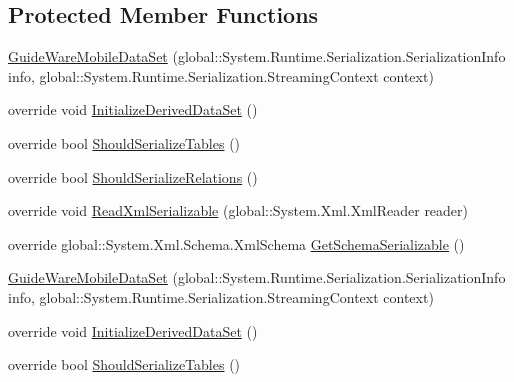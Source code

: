 \subsection*{Protected Member Functions}
\begin{DoxyCompactItemize}
\item 
\hyperlink{class_env_int_1_1_win32_1_1_field_tech_1_1_manager_1_1_data_sets_1_1_guide_ware_mobile_data_set_abcd4fc364c650c863fe0395878eba18a}{Guide\+Ware\+Mobile\+Data\+Set} (global\+::\+System.\+Runtime.\+Serialization.\+Serialization\+Info info, global\+::\+System.\+Runtime.\+Serialization.\+Streaming\+Context context)
\item 
override void \hyperlink{class_env_int_1_1_win32_1_1_field_tech_1_1_manager_1_1_data_sets_1_1_guide_ware_mobile_data_set_a732ff06fb24d4afabbf9208c37b83960}{Initialize\+Derived\+Data\+Set} ()
\item 
override bool \hyperlink{class_env_int_1_1_win32_1_1_field_tech_1_1_manager_1_1_data_sets_1_1_guide_ware_mobile_data_set_a2d30dace6369e9657f24e6832ae183f0}{Should\+Serialize\+Tables} ()
\item 
override bool \hyperlink{class_env_int_1_1_win32_1_1_field_tech_1_1_manager_1_1_data_sets_1_1_guide_ware_mobile_data_set_a681c962716335a5abcdbb317136a09ec}{Should\+Serialize\+Relations} ()
\item 
override void \hyperlink{class_env_int_1_1_win32_1_1_field_tech_1_1_manager_1_1_data_sets_1_1_guide_ware_mobile_data_set_ae591f1568d8b6daeb4b1b47973e4777e}{Read\+Xml\+Serializable} (global\+::\+System.\+Xml.\+Xml\+Reader reader)
\item 
override global\+::\+System.\+Xml.\+Schema.\+Xml\+Schema \hyperlink{class_env_int_1_1_win32_1_1_field_tech_1_1_manager_1_1_data_sets_1_1_guide_ware_mobile_data_set_a75399b922a2a3cf266e38a8e73c78a7c}{Get\+Schema\+Serializable} ()
\item 
\hyperlink{class_env_int_1_1_win32_1_1_field_tech_1_1_manager_1_1_data_sets_1_1_guide_ware_mobile_data_set_abcd4fc364c650c863fe0395878eba18a}{Guide\+Ware\+Mobile\+Data\+Set} (global\+::\+System.\+Runtime.\+Serialization.\+Serialization\+Info info, global\+::\+System.\+Runtime.\+Serialization.\+Streaming\+Context context)
\item 
override void \hyperlink{class_env_int_1_1_win32_1_1_field_tech_1_1_manager_1_1_data_sets_1_1_guide_ware_mobile_data_set_a732ff06fb24d4afabbf9208c37b83960}{Initialize\+Derived\+Data\+Set} ()
\item 
override bool \hyperlink{class_env_int_1_1_win32_1_1_field_tech_1_1_manager_1_1_data_sets_1_1_guide_ware_mobile_data_set_a2d30dace6369e9657f24e6832ae183f0}{Should\+Serialize\+Tables} ()

\end{DoxyCompactItemize}
